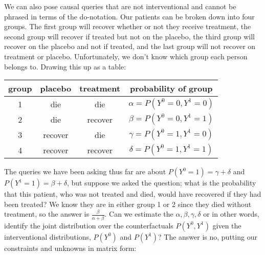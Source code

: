 \documentclass[11pt,a4paper]{article}
\begin{document}
We can also pose causal queries that are not interventional and cannot be phrased in terms of the do-notation. Our patients can be broken down into four groups. The first group will recover whether or not they receive treatment, the second group will recover if treated but not on the placebo, the third group will recover on the placebo and not if treated, and the last group will not recover on treatment or placebo. Unfortunately, we don't know which group each person belongs to. Drawing this up as a table:

\begin{tabular}{c|c|c|c}
group & placebo & treatment & probability of group\\
\hline
1 & die & die & $\alpha=P(Y^{0}=0,Y^{1}=0)$\\
2 & die & recover & $\beta=P(Y^{0}=0,Y^{1}=1)$\\
3 & recover & die & $\gamma=P(Y^{0}=1,Y^{1}=0)$\\
4 & recover & recover & $\delta=P(Y^{0}=1,Y^{1}=1)$\\
\end{tabular}

The queries we have been asking thus far are about $P(Y^{0}=1) = \gamma + \delta$ and $P(Y^{1}=1) = \beta + \delta$, but suppose we asked the question; what is the probability that this patient, who was not treated and died, would have recovered if they had been treated? We know they are in either group 1 or 2 since they died without treatment, so the answer is $\frac{\beta}{\alpha+\beta}$. Can we estimate the $\alpha, \beta, \gamma, \delta$ or in other words, identify the joint distribution over the counterfactuals $P(Y^{0},Y^{1})$ given the interventional distributions, $P(Y^{0})$ and $P(Y^{1})$? The answer is no, putting our constraints and unknowns in matrix form:
\end{document}

